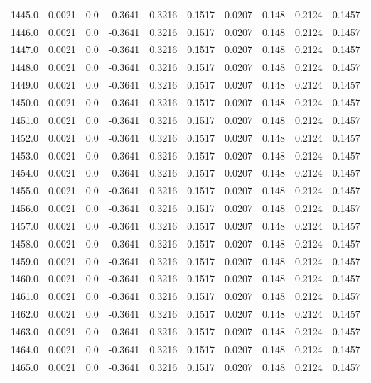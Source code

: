 \begin{longtable}{lrrrrrrrrr}
1445.0 & 0.0021 & 0.0 & -0.3641 & 0.3216 & 0.1517 & 0.0207 & 0.148 & 0.2124 & 0.1457 \\
1446.0 & 0.0021 & 0.0 & -0.3641 & 0.3216 & 0.1517 & 0.0207 & 0.148 & 0.2124 & 0.1457 \\
1447.0 & 0.0021 & 0.0 & -0.3641 & 0.3216 & 0.1517 & 0.0207 & 0.148 & 0.2124 & 0.1457 \\
1448.0 & 0.0021 & 0.0 & -0.3641 & 0.3216 & 0.1517 & 0.0207 & 0.148 & 0.2124 & 0.1457 \\
1449.0 & 0.0021 & 0.0 & -0.3641 & 0.3216 & 0.1517 & 0.0207 & 0.148 & 0.2124 & 0.1457 \\
1450.0 & 0.0021 & 0.0 & -0.3641 & 0.3216 & 0.1517 & 0.0207 & 0.148 & 0.2124 & 0.1457 \\
1451.0 & 0.0021 & 0.0 & -0.3641 & 0.3216 & 0.1517 & 0.0207 & 0.148 & 0.2124 & 0.1457 \\
1452.0 & 0.0021 & 0.0 & -0.3641 & 0.3216 & 0.1517 & 0.0207 & 0.148 & 0.2124 & 0.1457 \\
1453.0 & 0.0021 & 0.0 & -0.3641 & 0.3216 & 0.1517 & 0.0207 & 0.148 & 0.2124 & 0.1457 \\
1454.0 & 0.0021 & 0.0 & -0.3641 & 0.3216 & 0.1517 & 0.0207 & 0.148 & 0.2124 & 0.1457 \\
1455.0 & 0.0021 & 0.0 & -0.3641 & 0.3216 & 0.1517 & 0.0207 & 0.148 & 0.2124 & 0.1457 \\
1456.0 & 0.0021 & 0.0 & -0.3641 & 0.3216 & 0.1517 & 0.0207 & 0.148 & 0.2124 & 0.1457 \\
1457.0 & 0.0021 & 0.0 & -0.3641 & 0.3216 & 0.1517 & 0.0207 & 0.148 & 0.2124 & 0.1457 \\
1458.0 & 0.0021 & 0.0 & -0.3641 & 0.3216 & 0.1517 & 0.0207 & 0.148 & 0.2124 & 0.1457 \\
1459.0 & 0.0021 & 0.0 & -0.3641 & 0.3216 & 0.1517 & 0.0207 & 0.148 & 0.2124 & 0.1457 \\
1460.0 & 0.0021 & 0.0 & -0.3641 & 0.3216 & 0.1517 & 0.0207 & 0.148 & 0.2124 & 0.1457 \\
1461.0 & 0.0021 & 0.0 & -0.3641 & 0.3216 & 0.1517 & 0.0207 & 0.148 & 0.2124 & 0.1457 \\
1462.0 & 0.0021 & 0.0 & -0.3641 & 0.3216 & 0.1517 & 0.0207 & 0.148 & 0.2124 & 0.1457 \\
1463.0 & 0.0021 & 0.0 & -0.3641 & 0.3216 & 0.1517 & 0.0207 & 0.148 & 0.2124 & 0.1457 \\
1464.0 & 0.0021 & 0.0 & -0.3641 & 0.3216 & 0.1517 & 0.0207 & 0.148 & 0.2124 & 0.1457 \\
1465.0 & 0.0021 & 0.0 & -0.3641 & 0.3216 & 0.1517 & 0.0207 & 0.148 & 0.2124 & 0.1457 \\

\end{longtable}
